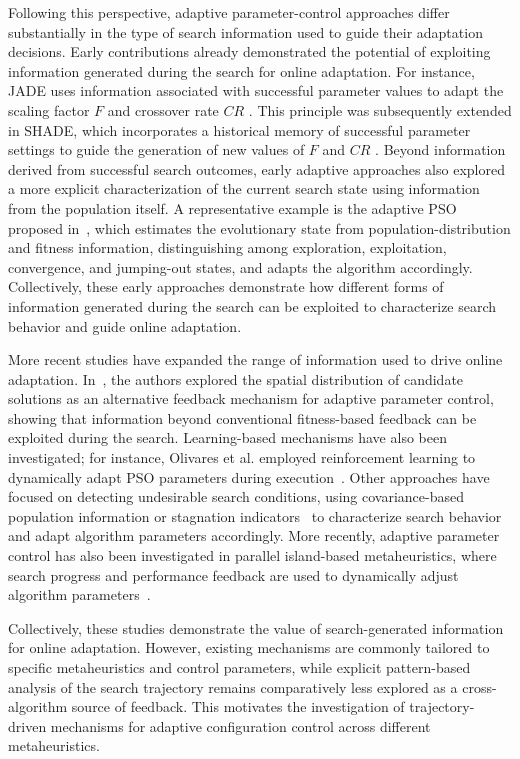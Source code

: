 \documentclass[mathematics,article,accept,moreauthors]{Definitions/mdpi}
\begin{document}
Following this perspective, adaptive parameter-control approaches differ
substantially in the type of search information used to guide their
adaptation decisions. Early contributions already demonstrated the potential
of exploiting information generated during the search for online adaptation.
For instance, JADE uses information associated with successful parameter
values to adapt the scaling factor $F$ and crossover rate $CR$
\cite{zhang2009jade}. This principle was subsequently extended in SHADE,
which incorporates a historical memory of successful parameter settings to
guide the generation of new values of $F$ and $CR$
\cite{tanabe2013success}. Beyond information derived from successful search
outcomes, early adaptive approaches also explored a more explicit
characterization of the current search state using information from the
population itself. A representative example is the adaptive PSO proposed in~\cite{zhan2009adaptive}, which estimates the evolutionary state from population-distribution and fitness information, distinguishing among exploration, exploitation,
convergence, and jumping-out states, and adapts the algorithm accordingly. Collectively, these early approaches demonstrate how different forms of information generated during the search can be exploited to characterize search behavior and guide online adaptation.

More recent studies have expanded the range of information used to drive
online adaptation. In~\cite{yang2022spatial}, the authors explored the spatial distribution of candidate
solutions as an alternative feedback mechanism for adaptive parameter control,
showing that information beyond conventional fitness-based feedback can be
exploited during the search. Learning-based mechanisms
have also been investigated; for instance, Olivares et al. employed
reinforcement learning to dynamically adapt PSO parameters during execution~\cite{olivares2023learning}. Other approaches have focused on detecting
undesirable search conditions, using covariance-based population information
\cite{song2024differential} or stagnation indicators~\cite{liu2024adaptive} to characterize search behavior and adapt algorithm parameters accordingly. More recently,
adaptive parameter control has also been investigated in parallel island-based
metaheuristics, where search progress and performance feedback are used to
dynamically adjust algorithm parameters~\cite{prado2025parameter}.



Collectively, these studies demonstrate the value of search-generated
information for online adaptation. However, existing mechanisms are commonly
tailored to specific metaheuristics and control parameters, while explicit
pattern-based analysis of the search trajectory remains comparatively less
explored as a cross-algorithm source of feedback. This motivates the
investigation of trajectory-driven mechanisms for adaptive configuration
control across different metaheuristics.
\end{document}
